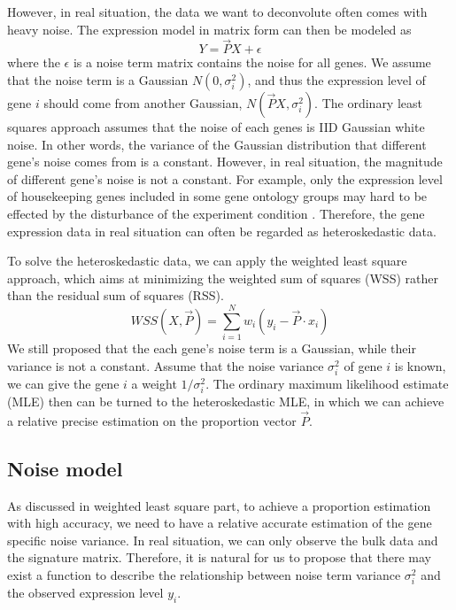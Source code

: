 \documentclass[10pt, a4paper, oneside]{article}
\begin{document}
However, in real situation, the data we want to deconvolute often comes with heavy noise. The expression model in matrix form can then be modeled as
\begin{equation}
    Y = \vec{P}X + \epsilon
\end{equation}
where the $\epsilon$ is a noise term matrix contains the noise for all genes. We assume that the noise term is a Gaussian $N(0, \sigma_i^2)$, and thus the expression
level of gene $i$ should come from another Gaussian, $N(\vec{P}X, \sigma_i^2)$. 
The ordinary least squares approach assumes that
the noise of each genes is IID Gaussian white noise. In other words, the variance of the Gaussian distribution that different gene's noise
comes from is a constant. However, in real situation, the magnitude of different gene's noise is not a constant. For example, only the expression level of housekeeping genes included in some gene ontology groups
may hard to be effected by the disturbance of the experiment condition \cite{chen2014gene}. Therefore, the gene expression data 
in real situation can often be regarded as heteroskedastic data.

To solve the heteroskedastic data, we can apply the weighted least square approach, which aims at minimizing the weighted sum of squares (WSS) rather than the residual sum of squares (RSS).
\begin{equation}
    WSS(X, \vec{P}) = \sum_{i=1}^N w_i(y_i - \vec{P} \cdot x_i)
\end{equation}
We still proposed that the each gene's noise term is a Gaussian, while their variance is not a constant. Assume that the noise
variance $\sigma_i^2$ of gene $i$ is known, we can give the gene $i$ a weight $1/\sigma_i^2$. The ordinary maximum likelihood estimate (MLE) then
can be turned to the heteroskedastic MLE, in which we can achieve a relative precise estimation on the proportion vector $\vec{P}$.

\subsection{Noise model}
\justify
As discussed in weighted least square part, to achieve a proportion estimation with high accuracy, we need to have a relative accurate estimation
of the gene specific noise variance. In real situation, we can only observe the bulk data and the signature matrix. Therefore, it is 
natural for us to propose that there may exist a function to describe the relationship between noise term variance $\sigma_i^2$ and the 
observed expression level $y_i$. 
\end{document}
